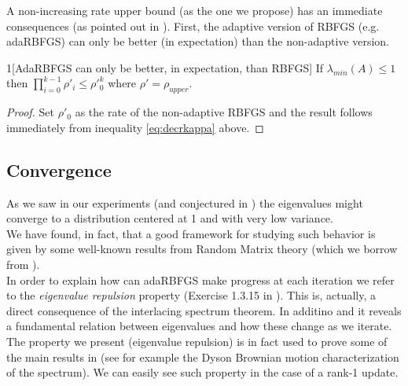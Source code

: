 \documentclass[12pt,conference,compsocconf]{IEEEtran}
\begin{document}
A non-increasing rate upper bound (as the one we propose) has an immediate consequences (as pointed out in \cite{Stich1}). First, the adaptive version of RBFGS (e.g. adaRBFGS) can only be better (in expectation) than the non-adaptive version. 
\begin{customcorollary}{1}[AdaRBFGS can only be better, in expectation, than RBFGS]
If $\lambda_{min}(A) \leq 1$ then $\prod_{i=0}^{k-1}\rho\prime_{i} \leq \rho\prime^{k}_0$ where $\rho\prime=\rho_{upper}$. \\
\begin{proof}
Set $\rho\prime_0$ as the rate of the non-adaptive RBFGS and the result follows immediately from inequality \ref{eq:decrkappa} above.
\end{proof}
\end{customcorollary}
\subsection{Convergence}\label{sect:convergence}
As we saw in our experiments (and conjectured in \cite{Gower1}) the eigenvalues might converge to a distribution centered at 1 and with very low variance.\\
We have found, in fact, that a good framework for studying such behavior is given by some well-known results from Random Matrix theory (which we borrow from \cite{Tao}).\\
In order to explain how can adaRBFGS make progress at each iteration we refer to the \textit{eigenvalue repulsion} property (Exercise 1.3.15 in \cite{Tao}). This is, actually, a direct consequence of the interlacing spectrum theorem. In additino and it reveals a fundamental relation between eigenvalues and how these change as we iterate. The property we present (eigenvalue repulsion) is in fact used to prove some of the main results in \cite{Tao} (see for example the Dyson Brownian motion characterization of the spectrum). We can easily see such property in the case of a rank-1 update. 
\end{document}
